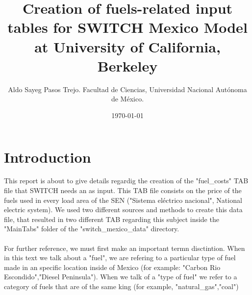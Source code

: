 \documentclass{article}
\author{Aldo Sayeg Pasos Trejo. Facultad de Ciencias, Universidad Nacional Autónoma de México.}
\date{\today}
\title{Creation of fuels-related input tables for SWITCH Mexico Model at University of California, Berkeley}
\begin{document}
\maketitle
\section{Introduction}
This report is about to give details regardig the creation of the "fuel\_costs" TAB file that SWITCH needs an as input. This TAB file consists on the price of the fuels used in every load area of the SEN ("Sistema eléctrico nacional", National electric system). We used two different sources and methods to create this data file, that resulted in two different TAB regarding this subject inside the "MainTabs" folder of the "switch\_mexico\_data" directory.
\\
\\For further reference, we must first make an important termn disctintion. When in this text we talk about a "fuel", we are refering to a particular type of fuel made in an specific location inside of Mexico (for example: "Carbon Rio Escondido","Diesel Peninsula"). When we talk of a "type of fuel" we refer to a category of fuels that are of the same king (for example, "natural_gas","coal")
\end{document}
